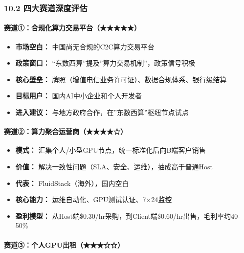 \documentclass[UTF8,a4paper,12pt]{ctexart}
\begin{document}
\subsubsection{10.2
四大赛道深度评估}\label{ux56dbux5927ux8d5bux9053ux6df1ux5ea6ux8bc4ux4f30}

\paragraph{赛道①：合规化算力交易平台（★★★★★）}\label{ux8d5bux9053ux2460ux5408ux89c4ux5316ux7b97ux529bux4ea4ux6613ux5e73ux53f0}

\begin{itemize}
\tightlist
\item
  \textbf{市场空白：} 中国尚无合规的C2C算力交易平台
\item
  \textbf{政策窗口：} ``东数西算''提及''算力交易机制''，政策信号积极
\item
  \textbf{核心壁垒：}
  牌照（增值电信业务许可证）、数据合规体系、银行级结算
\item
  \textbf{目标用户：} 国内AI中小企业和个人开发者
\item
  \textbf{进入建议：} 与地方政府合作，在''东数西算''枢纽节点试点
\end{itemize}

\paragraph{赛道②：算力聚合运营商（★★★★☆）}\label{ux8d5bux9053ux2461ux7b97ux529bux805aux5408ux8fd0ux8425ux5546}

\begin{itemize}
\tightlist
\item
  \textbf{模式：} 汇集个人/小型GPU节点，统一标准化后向B端客户销售
\item
  \textbf{价值：} 解决一致性问题（SLA、安全、运维），抽成高于普通Host
\item
  \textbf{代表：} FluidStack（海外），国内空白
\item
  \textbf{核心能力：} 运维自动化、GPU测试认证、7×24监控
\item
  \textbf{盈利模型：}
  从Host端\$0.30/hr采购，到Client端\$0.60/hr出售，毛利率约40-50\%
\end{itemize}

\paragraph{赛道③：个人GPU出租（★★★☆☆）}\label{ux8d5bux9053ux2462ux4e2aux4ebagpuux51faux79df}
\end{document}
